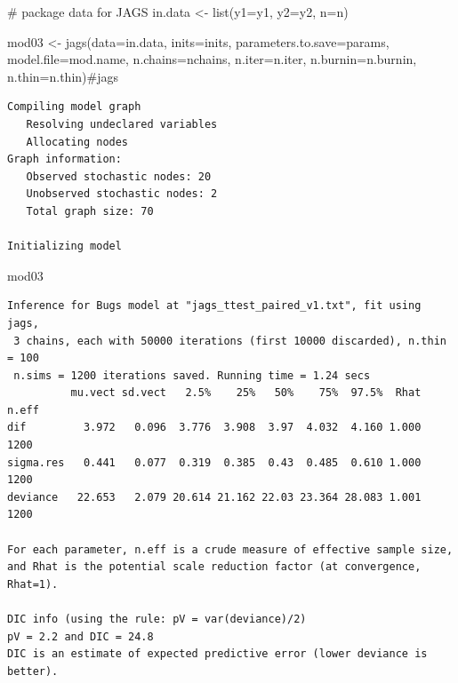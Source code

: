 \documentclass[
  13,
  letterpaper,
]{report}
\newenvironment{Shaded}{\begin{snugshade}}{\end{snugshade}}
\newcommand{\AttributeTok}[1]{\textcolor[rgb]{0.40,0.45,0.13}{#1}}
\newcommand{\CommentTok}[1]{\textcolor[rgb]{0.37,0.37,0.37}{#1}}
\newcommand{\FunctionTok}[1]{\textcolor[rgb]{0.28,0.35,0.67}{#1}}
\newcommand{\NormalTok}[1]{\textcolor[rgb]{0.00,0.23,0.31}{#1}}
\newcommand{\OtherTok}[1]{\textcolor[rgb]{0.00,0.23,0.31}{#1}}
\begin{document}
\begin{Shaded}
\begin{Highlighting}[]
\CommentTok{\# package data for JAGS}
\NormalTok{in.data }\OtherTok{\textless{}{-}} \FunctionTok{list}\NormalTok{(}\AttributeTok{y1=}\NormalTok{y1, }\AttributeTok{y2=}\NormalTok{y2, }\AttributeTok{n=}\NormalTok{n)}

\NormalTok{mod03 }\OtherTok{\textless{}{-}} \FunctionTok{jags}\NormalTok{(}\AttributeTok{data=}\NormalTok{in.data, }\AttributeTok{inits=}\NormalTok{inits,}
              \AttributeTok{parameters.to.save=}\NormalTok{params,}
              \AttributeTok{model.file=}\NormalTok{mod.name,}
              \AttributeTok{n.chains=}\NormalTok{nchains, }\AttributeTok{n.iter=}\NormalTok{n.iter,}
              \AttributeTok{n.burnin=}\NormalTok{n.burnin, }\AttributeTok{n.thin=}\NormalTok{n.thin)}\CommentTok{\#jags}
\end{Highlighting}
\end{Shaded}

\begin{verbatim}
Compiling model graph
   Resolving undeclared variables
   Allocating nodes
Graph information:
   Observed stochastic nodes: 20
   Unobserved stochastic nodes: 2
   Total graph size: 70

Initializing model
\end{verbatim}

\begin{Shaded}
\begin{Highlighting}[]
\NormalTok{mod03}
\end{Highlighting}
\end{Shaded}

\begin{verbatim}
Inference for Bugs model at "jags_ttest_paired_v1.txt", fit using jags,
 3 chains, each with 50000 iterations (first 10000 discarded), n.thin = 100
 n.sims = 1200 iterations saved. Running time = 1.24 secs
          mu.vect sd.vect   2.5%    25%   50%    75%  97.5%  Rhat n.eff
dif         3.972   0.096  3.776  3.908  3.97  4.032  4.160 1.000  1200
sigma.res   0.441   0.077  0.319  0.385  0.43  0.485  0.610 1.000  1200
deviance   22.653   2.079 20.614 21.162 22.03 23.364 28.083 1.001  1200

For each parameter, n.eff is a crude measure of effective sample size,
and Rhat is the potential scale reduction factor (at convergence, Rhat=1).

DIC info (using the rule: pV = var(deviance)/2)
pV = 2.2 and DIC = 24.8
DIC is an estimate of expected predictive error (lower deviance is better).
\end{verbatim}
\end{document}

